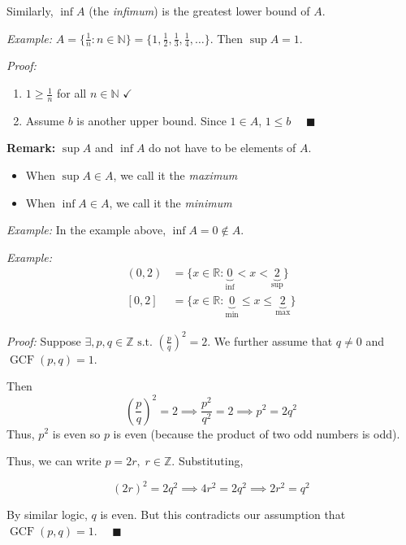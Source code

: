 \documentclass[12pt]{report}
\newcommand{\R}{\mathbb{R}}
\newcommand{\Z}{\mathbb{Z}}
\newcommand{\N}{\mathbb{N}}
\newcommand{\qed}{\quad \blacksquare}
\newcommand{\st}{\text{ s.t. }}
\DeclareMathOperator{\gcf}{GCF}
\newenvironment*{tbox}[2][gray]{
    \begin{tcolorbox}[
        parbox=false,
        colback=#1!5!white,
        colframe=#1!75!black,
        breakable,
        title={#2}
    ]}
    {\end{tcolorbox}}
\begin{document}
        Similarly, $\inf A$ (the \emph{infimum}) is the greatest lower bound of $A$.

        \emph{Example:} $A = \{\frac{1}{n}: n \in \N\} = \{1, \frac{1}{2}, \frac{1}{3}, \frac{1}{4}, \dots\}$. Then $\sup A = 1$.

        \emph{Proof:} 
        \begin{enumerate}
            \item $1 \geq \frac{1}{n}$ for all $n \in \N$ $\checkmark$ 
            \item Assume $b$ is another upper bound. Since $1 \in A$, $1 \leq b$ $\qed$
        \end{enumerate}

        \textbf{Remark:} $\sup A$ and $\inf A$ do not have to be elements of $A$. 
        \begin{itemize}
            \item When $\sup A \in A$, we call it the \emph{maximum}
            \item When $\inf A \in A$, we call it the \emph{minimum}
        \end{itemize}

        \emph{Example:} In the example above, $\inf A = 0 \notin A$.

        \emph{Example:}
        \begin{align*}
            (0, 2) &= \{x \in \R: \underbrace{0}_{\inf} < x < \underbrace{2}_{\sup}\}\\ 
            [0, 2] &= \{x \in \R: \underbrace{0}_{\min} \leq x \leq \underbrace{2}_{\max}\}
        \end{align*}
        
        \begin{tbox}{\textbf{Theorem:} There is no rational number whose square is 2}
            \emph{Proof:} Suppose $\exists, p, q \in \Z \st (\frac{p}{q})^2 = 2$. We further assume that $q \neq 0$ and $\gcf(p, q) = 1$. 

            Then 
            \[(\frac{p}{q})^2 = 2 \implies \frac{p^2}{q^2} = 2 \implies p^2 = 2q^2\]
            Thus, $p^2$ is even so $p$ is even (because the product of two odd numbers is odd). 

            Thus, we can write $p = 2r, \; r \in \Z$. Substituting, 

            \[(2r)^2 = 2q^2 \implies 4r^2 = 2q^2 \implies 2r^2 = q^2\]
            
            By similar logic, $q$ is even. But this contradicts our assumption that $\gcf(p, q) = 1$. $\qed$
        \end{tbox}
\end{document}
